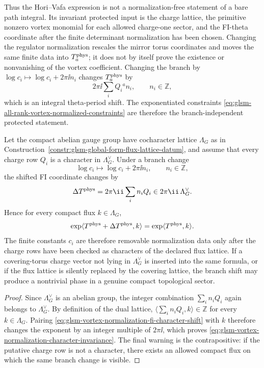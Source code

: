 Thus the Hori--Vafa expression is not a normalization-free statement of a
bare path integral.  Its invariant protected input is the charge lattice, the
primitive nonzero vortex monomial for each allowed charge-one sector, and the
FI-theta coordinate after the finite determinant normalization has been
chosen.  Changing the regulator normalization rescales the mirror torus
coordinates and moves the same finite data into \(T_a^{\rm phys}\); it does
not by itself prove the existence or nonvanishing of the vortex coefficient.
Changing the branch by \(\log c_i\mapsto\log c_i+2\pi\ii n_i\) changes
\(T_a^{\rm phys}\) by
\[
  2\pi\ii\sum_iQ_i{}^a n_i ,
  \qquad n_i\in\mathbb Z ,
\]
which is an integral theta-period shift.  The exponentiated constraints
\eqref{eq:glsm-all-rank-vortex-normalized-constraints} are therefore the
branch-independent protected statement.

\begin{proposition}
\label{prop:glsm-vortex-normalization-fi-character}
Let the compact abelian gauge group have cocharacter lattice
\(\Lambda_G\) as in
Construction~\ref{constr:glsm-global-form-flux-lattice-datum}, and assume
that every charge row \(Q_i\) is a character in \(\Lambda_G^\vee\).  Under a
branch change
\[
  \log c_i\longmapsto \log c_i+2\pi\ii n_i,
  \qquad n_i\in\mathbb Z ,
\]
the shifted FI coordinate changes by
\begin{equation}
  \Delta T^{\rm phys}
  =
  2\pi\ii\sum_i n_i Q_i
  \in 2\pi\ii\,\Lambda_G^\vee .
  \label{eq:glsm-vortex-normalization-fi-character-shift}
\end{equation}
Hence for every compact flux \(k\in\Lambda_G\),
\begin{equation}
  \exp\langle T^{\rm phys}+\Delta T^{\rm phys},k\rangle
  =
  \exp\langle T^{\rm phys},k\rangle .
  \label{eq:glsm-vortex-normalization-character-invariance}
\end{equation}
The finite constants \(c_i\) are therefore removable normalization data only
after the charge rows have been checked as characters of the declared flux
lattice.  If a covering-torus charge vector not lying in
\(\Lambda_G^\vee\) is inserted into the same formula, or if the flux lattice is
silently replaced by the covering lattice, the branch shift may produce a
nontrivial phase in a genuine compact topological sector.
\end{proposition}

\begin{proof}
Since \(\Lambda_G^\vee\) is an abelian group, the integer combination
\(\sum_i n_iQ_i\) again belongs to \(\Lambda_G^\vee\).  By definition of the
dual lattice, \(\langle \sum_i n_iQ_i,k\rangle\in\mathbb Z\) for every
\(k\in\Lambda_G\).  Pairing
\eqref{eq:glsm-vortex-normalization-fi-character-shift} with \(k\) therefore
changes the exponent by an integer multiple of \(2\pi\ii\), which proves
\eqref{eq:glsm-vortex-normalization-character-invariance}.  The final
warning is the contrapositive: if the putative charge row is not a character,
there exists an allowed compact flux on which the same branch change is
visible.
\end{proof}

